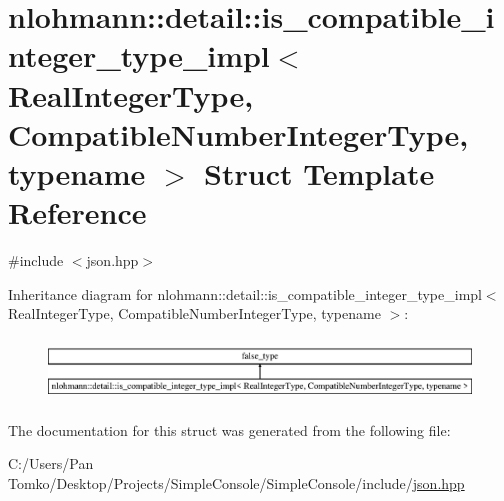 \hypertarget{structnlohmann_1_1detail_1_1is__compatible__integer__type__impl}{}\section{nlohmann\+::detail\+::is\+\_\+compatible\+\_\+integer\+\_\+type\+\_\+impl$<$ Real\+Integer\+Type, Compatible\+Number\+Integer\+Type, typename $>$ Struct Template Reference}
\label{structnlohmann_1_1detail_1_1is__compatible__integer__type__impl}


{\ttfamily \#include $<$json.\+hpp$>$}

Inheritance diagram for nlohmann\+::detail\+::is\+\_\+compatible\+\_\+integer\+\_\+type\+\_\+impl$<$ Real\+Integer\+Type, Compatible\+Number\+Integer\+Type, typename $>$\+:\begin{figure}[H]
\begin{center}
\leavevmode
\includegraphics[height=1.699545cm]{dd/d13/structnlohmann_1_1detail_1_1is__compatible__integer__type__impl}
\end{center}
\end{figure}


The documentation for this struct was generated from the following file\+:\begin{DoxyCompactItemize}
\item 
C\+:/\+Users/\+Pan Tomko/\+Desktop/\+Projects/\+Simple\+Console/\+Simple\+Console/include/\mbox{\hyperlink{json_8hpp}{json.\+hpp}}\end{DoxyCompactItemize}
